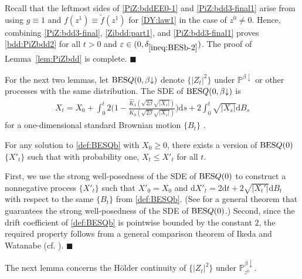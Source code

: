 \documentclass[12pt, twoside]{article}
\numberwithin{figure}{section}
\newcommand{\BES}{{\rm BES}}
\newcommand{\1}{\mathds 1}
\newcommand{\vep}{{\varepsilon}}
\newcommand{\da}{{\downarrow}}
\renewcommand{\P}{{\mathbb P}}
\renewcommand{\d}{{\mathrm d}}
\newcommand{\2}{{\mathbf 1}}
\renewenvironment{proof}[1][\proofname]{\noindent {\bfseries #1.}\;}{\hfill\ensuremath{\blacksquare}\\}
\newcommand{\cc}{{^\circ}}
\newcommand{\hK}{{\widehat{K}}}
\newcommand{\deltaz}{\delta_{\ref{ineq:BESb-2}}}
\begin{document}
\begin{proof}[Proof of Lemma~\ref{lem:PiZbdd}]
Recall that the leftmost sides of \eqref{PiZ:bddEE0-1} and \eqref{PiZ:bdd3-final1} arise from using $g\equiv 1$ and $f(z^1)\equiv \tilde{f}(z^1)$ for \eqref{DY:law1} in the case of $z^0\neq 0$. Hence, 
combining  \eqref{PiZ:bdd3-final}, \eqref{Zibdd:part1}, and \eqref{PiZ:bdd3-final1} proves \eqref{bdd:PiZbdd2} for all $t>0$ and $\vep\in (0,\deltaz)$. The proof of Lemma~\ref{lem:PiZbdd} is complete.
\end{proof}

For the next two lemmas, let $\BES Q(0,\beta\da)$ denote $\{|Z_t|^2\}$ under $\P^{\beta\da}$ or other processes with the same distribution. The SDE of $\BES Q(0,\beta\da)$ is
\begin{align}\label{def:BESQb}
X_t=X_0+\int_0^t 2\biggl(1-\frac{\hK_1(\sqrt{2\beta}\sqrt{|X_s|})}{K_0(\sqrt{2\beta}\sqrt{|X_s|})}\biggr)\d s+2\int_0^t\sqrt{|X_s|}\d B_s
\end{align}
for a one-dimensional standard Brownian motion $\{B_t\}$ \cite[Theorem~2.15 (1$\cc$)]{C:BES}. 

\begin{lem}\label{lem:BESQb2}
For any solution to \eqref{def:BESQb} with $X_0\geq 0$, there exists a version of $\BES Q(0)$ $\{X'_t\}$ such that  with probability one, $X_t\leq X'_t$ for all $t$.
\end{lem}
\begin{proof} 
First, we use the strong well-posedness of the SDE of $\BES Q(0)$ to construct a nonnegative process $\{X'_t\}$ such that  $X'_0=X_0$ and $\d X'_t=2\d t+2\sqrt{|X_t'|}\d B_t$ with respect to the same $\{B_t\}$ from \eqref{def:BESQb}. (See \cite[Theorem~3.2 of Chapter~IV, p.182]{IW:SDE} for
 a general theorem that guarantees the strong well-posedness of the SDE of $\BES Q(0)$.)
Second, since the drift coefficient of \eqref{def:BESQb} is pointwise bounded by the constant $2$, the required property follows from a general comparison theorem of Ikeda and Watanabe (cf. \cite[Theorem~1.1 of Chapter VI, pp.437--438]{IW:SDE}). 
\end{proof}

The next lemma concerns the H\"older continuity of $\{|Z_t|^2\}$ under $\P^{\beta\da}_{z^0}$.  
\end{document}
